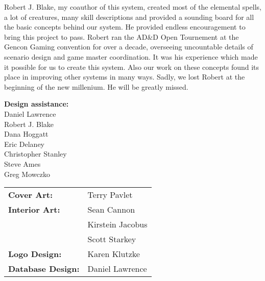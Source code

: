 Robert J. Blake, my coauthor of this system, created most of the elemental spells, a lot of creatures, many skill descriptions and provided a sounding board for all the basic concepts behind our system. He provided endless encouragement to bring this project to pass. Robert ran the AD\&D Open Tournement at the Gencon Gaming convention for over a decade, overseeing uncountable details of scenario design and game master coordination. It was his experience which made it possible for us to create this system. Also our work on these concepts found its place in improving other systems in many ways. Sadly, we lost Robert at the beginning of the new millenium. He will be greatly missed.

\textbf{Design assistance:}\\
Daniel Lawrence\\
Robert J. Blake\\
Dana Hoggatt\\
Eric Delaney\\
Christopher Stanley\\
Steve Ames\\
Greg Mowczko

\begin{tabular}{ l l }
\textbf{Cover Art:} & Terry Pavlet\\
\textbf{Interior Art:} & Sean Cannon\\
 & Kirstein Jacobus\\
 & Scott Starkey\\
\textbf{Logo Design:} & Karen Klutzke\\
\textbf{Database Design:} & Daniel Lawrence\\
\end{tabular}

